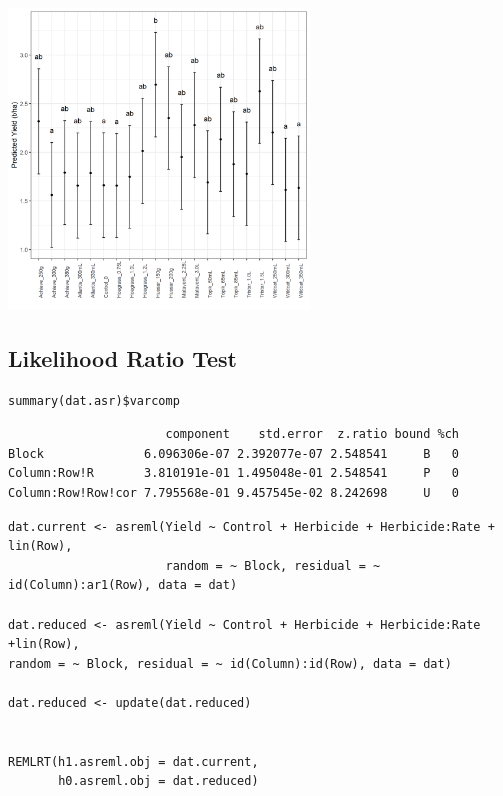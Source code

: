 \documentclass[a4paper, 10pt, fleqn, twosided]{memoir}
\begin{document}
\begin{tcolorbox}[title = Example 7 Graph of predicted Control values]
\includegraphics[width=0.6\textwidth, frame]{Example7HerbRatePred.png}
\end{tcolorbox}


\subsection{Likelihood Ratio Test}

\begin{tcolorbox}[title = Example 7 Variance Components]
\begin{verbatim}
summary(dat.asr)$varcomp
\end{verbatim}
\end{tcolorbox}

\begin{tcolorbox}[title = Example 7 Variance Component output]
\begin{verbatim}
                      component    std.error  z.ratio bound %ch
Block              6.096306e-07 2.392077e-07 2.548541     B   0
Column:Row!R       3.810191e-01 1.495048e-01 2.548541     P   0
Column:Row!Row!cor 7.795568e-01 9.457545e-02 8.242698     U   0

\end{verbatim}
\end{tcolorbox}


\begin{tcolorbox}[title = Example 7 Likelihood Ratio Test]
\begin{verbatim}
dat.current <- asreml(Yield ~ Control + Herbicide + Herbicide:Rate + lin(Row),
                      random = ~ Block, residual = ~ id(Column):ar1(Row), data = dat)

dat.reduced <- asreml(Yield ~ Control + Herbicide + Herbicide:Rate +lin(Row),
random = ~ Block, residual = ~ id(Column):id(Row), data = dat)

dat.reduced <- update(dat.reduced)


REMLRT(h1.asreml.obj = dat.current,
       h0.asreml.obj = dat.reduced)
\end{verbatim}
\end{tcolorbox}
\end{document}

